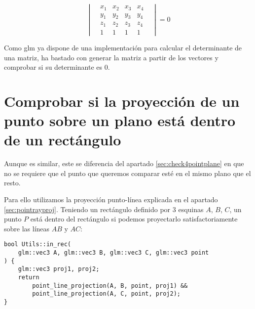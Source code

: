 \[
\begin{vmatrix}
& x_1 & x_2 & x_3 & x_4 &\\ 
& y_1 & y_2 & y_3 & y_4 &\\ 
& z_1 & z_2 & z_3 & z_4 &\\ 
& 1   & 1   & 1   & 1   &
\end{vmatrix} = 0
\]

Como glm ya dispone de una implementación para calcular el determinante de una matriz, ha bastado con generar la matriz a partir de los vectores y comprobar si su determinante es 0.

\section{Comprobar si la proyección de un punto sobre un plano está dentro de un rectángulo}
Aunque es similar, este se diferencia del apartado \ref{sec:check4pointplane} en que no se requiere que el punto que queremos comparar esté en el mismo plano que el resto.

Para ello utilizamos la proyección punto-línea explicada en el apartado \ref{sec:pointrayproj}. Teniendo un rectángulo definido por 3 esquinas $A$, $B$, $C$, un punto $P$ está dentro del rectángulo si podemos proyectarlo satisfactoriamente sobre las líneas $AB$ y $AC$:

\begin{lstlisting}
bool Utils::in_rec(
    glm::vec3 A, glm::vec3 B, glm::vec3 C, glm::vec3 point
) {
	glm::vec3 proj1, proj2;
	return 
		point_line_projection(A, B, point, proj1) && 
		point_line_projection(A, C, point, proj2);
}
\end{lstlisting}
